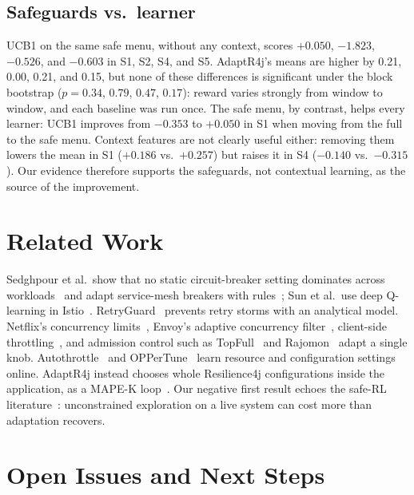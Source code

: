 \documentclass[journal]{IEEEtran}
\newcommand{\adaptr}{AdaptR4j\xspace}
\newcommand{\rFJ}{Resilience4j\xspace}
\begin{document}
\subsection{Safeguards vs.\ learner}
\label{sec:attribution}

UCB1 on the same safe menu, without any context, scores $+0.050$, $-1.823$, $-0.526$, and
$-0.603$ in S1, S2, S4, and S5. \adaptr's means are higher by 0.21, 0.00, 0.21, and 0.15, but none
of these differences is significant under the block bootstrap ($p=0.34$, $0.79$, $0.47$, $0.17$):
reward varies strongly from window to window, and each baseline was run once. The safe menu, by
contrast, helps every learner: UCB1 improves from $-0.353$ to $+0.050$ in S1 when moving from the
full to the safe menu. Context features are not clearly useful either: removing them lowers the
mean in S1 ($+0.186$ vs.\ $+0.257$) but raises it in S4 ($-0.140$ vs.\ $-0.315$).
Our evidence therefore supports the safeguards, not contextual learning, as the source of
the improvement.

\section{Related Work}

Sedghpour et al.\ show that no static circuit-breaker setting dominates across
workloads~\cite{sedghpour2022} and adapt service-mesh breakers with rules~\cite{sedghpour2023};
Sun et al.\ use deep Q-learning in Istio~\cite{sun2024}. RetryGuard~\cite{retryguard2025}
prevents retry storms with an analytical model. Netflix's concurrency limits~\cite{netflixlimits},
Envoy's adaptive concurrency filter~\cite{envoyadaptive}, client-side
throttling~\cite{sre2016}, and admission control such as TopFull~\cite{topfull2024} and
Rajomon~\cite{xing2025} adapt a single knob. Autothrottle~\cite{autothrottle2024} and
OPPerTune~\cite{oppertune2024} learn resource and configuration settings online. \adaptr instead
chooses whole \rFJ configurations inside the application, as a MAPE-K
loop~\cite{kephart2003,garlan2004}. Our negative first result echoes the safe-RL
literature~\cite{garcia2015,wu2016conservative}: unconstrained exploration on a live system can
cost more than adaptation recovers.

\section{Open Issues and Next Steps}
\label{sec:open}
\end{document}
